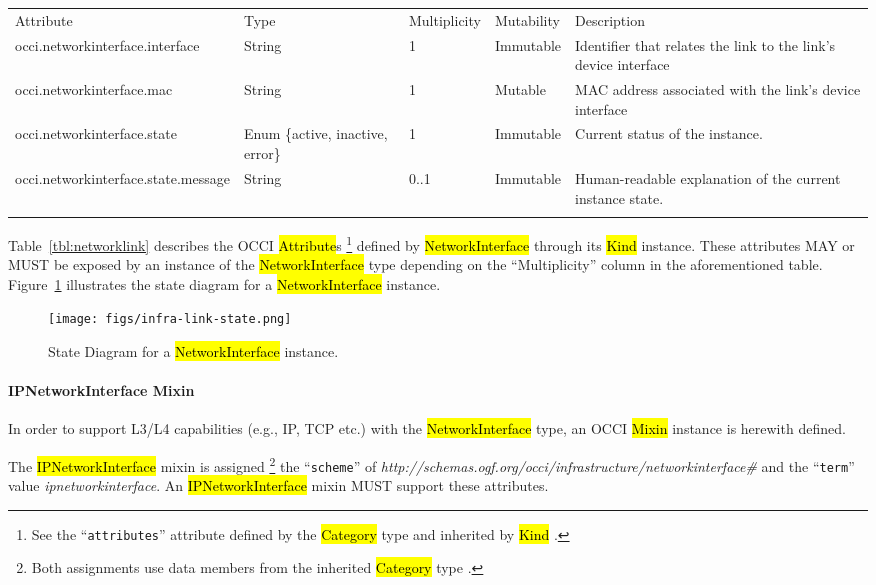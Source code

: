 \documentclass[10pt,a4paper]{article}
\begin{document}
{
	\begin{tabular}{lp{2.5cm}p{1cm}lp{5cm}}
	\toprule
	Attribute&Type&Multi\-plicity&Mutability&Description\\
	\colrule
	occi.networkinterface.interface & String & 1 & Immutable
	& Identifier that relates the link to the link's device interface\\
	occi.networkinterface.mac & String & 1 & Mutable
	& MAC address associated with the link's device interface\\
	occi.networkinterface.state & Enum \{active, inactive, error\}& 1
	& Immutable & Current status of the instance.\\
	occi.networkinterface.state.message & String & 0..1 & Immutable
	& Human-readable explanation of the current instance state.\\
	\botrule
	\end{tabular}
}

Table~\ref{tbl:networklink} describes the OCCI \hl{Attribute}s%
\footnote{See the ``{\tt attributes}'' attribute defined by the
  \hl{Category} type and inherited by \hl{Kind} \cite{occi:core}.}
defined by \hl{NetworkInterface} through its \hl{Kind} instance. These
attributes MAY or MUST be exposed by an instance of the \hl{NetworkInterface} type
depending on the ``Multiplicity'' column in the aforementioned table.
Figure~\ref{fig:networklink_state} illustrates the state
diagram for a \hl{NetworkInterface} instance.

\begin{figure}[!h]
	\centering
	\texttt{[image: figs/infra-link-state.png]}
	\caption{State Diagram for a \hl{NetworkInterface} instance.}
	\label{fig:networklink_state}
\end{figure}

\paragraph{IPNetworkInterface Mixin}
In order to support L3/L4 capabilities (e.g., IP, TCP etc.) with the
\hl{NetworkInterface} type, an OCCI \hl{Mixin} instance is herewith
defined.

The \hl{IPNetworkInterface} mixin is assigned%
\footnote{Both assignments use data members from the inherited \hl{Category}
type \cite{occi:core}.}
the ``{\tt scheme}'' of
\textit{http://schemas.ogf.org/occi/infrastructure/networkinterface\#} and the ``{\tt term}'' value
\textit{ipnetworkinterface}.
An \hl{IPNetworkInterface} mixin MUST support these attributes.
\end{document}
